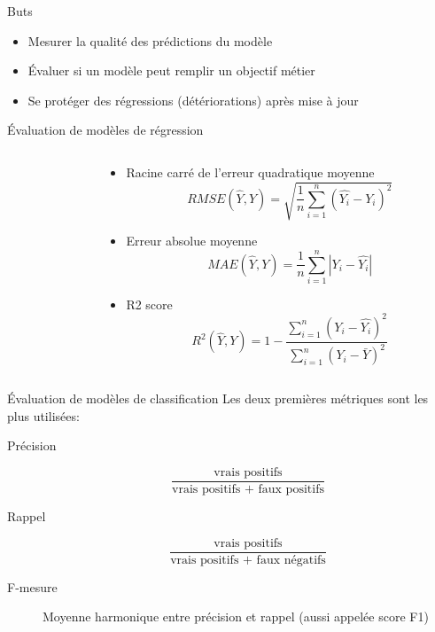 \begin{frame}{Buts}
  \begin{itemize}[<+->]
    \item Mesurer la qualité des prédictions du modèle
    \item Évaluer si un modèle peut remplir un objectif métier
    \item Se protéger des régressions (détériorations) après mise à jour
  \end{itemize}
\end{frame}

\begin{frame}{Évaluation de modèles de régression}
  \begin{columns}
    \begin{column}{.48\textwidth}
    \end{column}
    \begin{column}{.70\textwidth}
      \begin{itemize}
        \item Racine carré de l'erreur quadratique moyenne $$RMSE(\hat{Y}, Y) = \sqrt{\frac{1}{n} \sum_{i=1}^n (\hat{Y_i} - Y_i)^2}$$
        \item Erreur absolue moyenne $$MAE(\hat{Y}, Y) = \frac{1}{n} \sum_{i=1}^n |Y_i - \hat{Y_i}|$$
        \item R2 score $$R^2(\hat{Y}, Y) = 1 - \frac{\sum_{i=1}^n (Y_i - \hat{Y_i})^2}{\sum_{i=1}^n (Y_i - \bar{Y})^2}$$
      \end{itemize}
    \end{column}
  \end{columns}
  
\end{frame}

\begin{frame}{Évaluation de modèles de classification}
  Les deux premières métriques sont les plus utilisées:
  \begin{description}
  \item[Précision]
    \[
    \frac{\text{vrais positifs}}{\text{vrais positifs + faux positifs}}
    \]
  \item[Rappel]
    \[
    \frac{\text{vrais positifs}}{\text{vrais positifs + faux négatifs}}
  \]
  \item[F-mesure] Moyenne harmonique entre précision et rappel (aussi appelée score F1)
  \end{description}
\end{frame}

